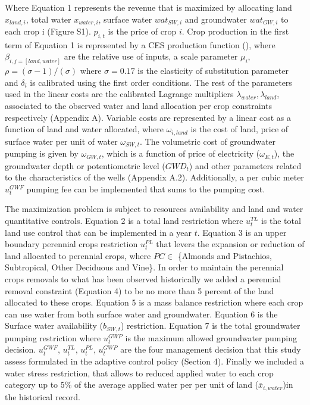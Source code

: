 \documentclass[11pt,a4paper]{article}
\begin{document}
Where Equation 1 represents the revenue that is maximized by allocating land $x_{land,i}$, total water $x_{water,i}$, surface water $wat_{SW,i}$ and groundwater $wat_{GW,i}$ to each crop i (Figure S1). $p_{i,t}$ is the price of crop $i$. Crop production in the first term of Equation 1 is represented by a CES production function (\cite{debertin_agricultural_2012}), where $\beta_{i,j=[land,water]}$ are the relative use of inputs, a scale parameter $\mu_{i}$, $\rho = (\sigma-1)/(\sigma)$ where $\sigma = 0.17$ is the elasticity of substitution parameter and $\delta_{i}$ is calibrated using the first order conditions. The rest of the parameters used in the linear costs are the calibrated Lagrange multipliers $\lambda_{water},\lambda_{land}$, associated to the observed water and land allocation per crop constraints respectively (Appendix A). Variable costs are represented by a linear cost as a function of land and water allocated, where $\omega_{i,land}$ is the cost of land, price of surface water per unit of water $\omega_{SW,t}$. The volumetric cost of groundwater pumping is given by $\omega_{GW,t}$, which is a function of price of electricity ($\omega_{E,t}$), the groundwater depth or potentiometric level ($GWD_t$) and other parameters related to the characteristics of the wells (Appendix A.2). Additionally, a per cubic meter $u^{GWF}_{t}$ pumping fee can be implemented that sums to the pumping cost.

The maximization problem is subject to resources availability and land and water quantitative controls. Equation 2 is a total land restriction where $u^{TL}_{t}$ is the total land use control that can be implemented in a year $t$. Equation 3 is an upper boundary perennial crops restriction $u^{PL}_{t}$ that levers the expansion or reduction of land allocated to perennial crops, where $PC \in$ \{Almonds and Pistachios, Subtropical, Other Deciduous and Vine\}. In order to maintain the perennial crops removals to what has been observed historically we added a perennial removal constraint (Equation 4) to be no more than 5 percent of the land allocated to these crops. Equation 5 is a mass balance restriction where each crop can use water from both surface water and groundwater. Equation 6 is the Surface water availability ($b_{SW,t}$) restriction. Equation 7 is the total groundwater pumping restriction where $u^{GWP}_{t}$ is the maximum allowed groundwater pumping decision. $u^{GWF}_{t}$, $u^{TL}_{t}$, $u^{PL}_{t}$, $u^{GWP}_{t}$ are the four management decision that this study assess formulated in the adaptive control policy (Section  4). Finally we included a water stress restriction, that allows to reduced applied water to each crop category up to 5\% of the average applied water per per unit of land ($\bar{x}_{i,water}$)in the historical record.
\end{document}
